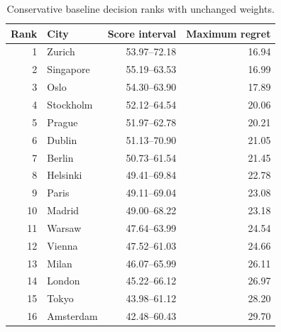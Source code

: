 \begin{table}[!ht]\centering
\caption{Conservative baseline decision ranks with unchanged weights.}\label{tab:baseline}
\begin{tabular}{rlrr}\toprule
Rank & City & Score interval & Maximum regret\\\midrule
1 & Zurich & 53.97--72.18 & 16.94 \\
2 & Singapore & 55.19--63.53 & 16.99 \\
3 & Oslo & 54.30--63.90 & 17.89 \\
4 & Stockholm & 52.12--64.54 & 20.06 \\
5 & Prague & 51.97--62.78 & 20.21 \\
6 & Dublin & 51.13--70.90 & 21.05 \\
7 & Berlin & 50.73--61.54 & 21.45 \\
8 & Helsinki & 49.41--69.84 & 22.78 \\
9 & Paris & 49.11--69.04 & 23.08 \\
10 & Madrid & 49.00--68.22 & 23.18 \\
11 & Warsaw & 47.64--63.99 & 24.54 \\
12 & Vienna & 47.52--61.03 & 24.66 \\
13 & Milan & 46.07--65.99 & 26.11 \\
14 & London & 45.22--66.12 & 26.97 \\
15 & Tokyo & 43.98--61.12 & 28.20 \\
16 & Amsterdam & 42.48--60.43 & 29.70 \\
\bottomrule\end{tabular}\end{table}
